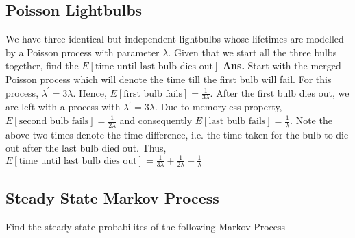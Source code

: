 \documentclass[11pt, a4paper]{article}
\begin{document}
    \subsection{Poisson Lightbulbs}
    We have three identical but independent lightbulbs whose lifetimes are modelled by a Poisson process with parameter $\lambda$. Given that we start all the three bulbs together, find the $E[\text{time until last bulb dies out}]$ \newline \newline
    \textbf{Ans.} Start with the merged Poisson process which will denote the time till the first bulb will fail. For this process, $\lambda^{'} = 3\lambda$. Hence, $E[\text{first bulb fails}] = \frac{1}{3\lambda}$.\newline
    After the first bulb dies out, we are left with a process with $\lambda^{'} = 3\lambda$. Due to memoryless property, $E[\text{second bulb fails}] = \frac{1}{2\lambda}$ and consequently $E[\text{last bulb fails}] = \frac{1}{\lambda}$. \newline
    Note the above two times denote the time difference, i.e. the time taken for the bulb to die out after the last bulb died out. Thus, $E[\text{time until last bulb dies out}] = \frac{1}{3\lambda} + \frac{1}{2\lambda} + \frac{1}{\lambda}$

    
    \subsection{Steady State Markov Process}
    Find the steady state probabilites of the following Markov Process\newline
    \begin{center}
    \end{center}
    
\end{document}

